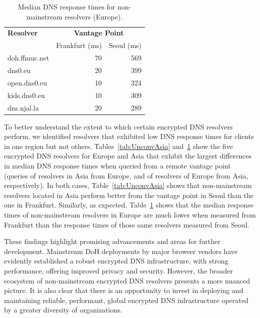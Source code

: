 \begin{table}[t!]
\centering
\scriptsize
\begin{tabular}{l|rr}
\toprule
\textbf{Resolver} & \multicolumn{2}{c}{\textbf{Vantage Point}} \\
                  & \textrm{Frankfurt (ms)}     & \textrm{Seoul (ms)} \\
\midrule
doh.ffmuc.net                               & 70 & 569                         \\
dns0.eu                        & 20 & 399                         \\
open.dns0.eu         & 10 & 324                         \\
kids.dns0.eu                                 & 10 & 309                         \\
dns.njal.la                        & 20 & 289                         \\
\bottomrule
\end{tabular}
    \caption{Median DNS response times for non-mainstream resolvers (Europe).}
\label{tab:UnconvEur}
\end{table}


To better understand the extent to which certain encrypted DNS resolvers
perform, we identified
resolvers that exhibited low DNS response times for clients in one region
but not others. 
Tables~\ref{tab:UnconvAsia} and~\ref{tab:UnconvEur} show 
the five encrypted DNS resolvers for Europe and Asia that exhibit the 
largest differences in median DNS response times when
queried from a remote vantage point (queries of resolvers in Asia from Europe,
and of resolvers of Europe from Asia, respectively). In both cases, 
Table~\ref{tab:UnconvAsia} shows that non-mainstream resolvers located
in Asia perform better from the vantage point in Seoul than the one in
Frankfurt.  Similarly, as expected, Table~\ref{tab:UnconvEur} shows that the
median response times of non-mainstream resolvers in Europe are much lower when
measured from Frankfurt than the response times of those same resolvers
measured from Seoul.

These findings highlight promising advancements and areas for further development. Mainstream DoH deployments by major browser vendors have evidently established a robust encrypted DNS infrastructure, with strong performance, offering improved privacy and security. However, the broader ecosystem of non-mainstream encrypted DNS resolvers presents a more nuanced picture. 
It is also clear that there is an opportunity
to invest in deploying and maintaining reliable, performant, global encrypted
DNS infrastructure operated by a greater diversity of organizations.

